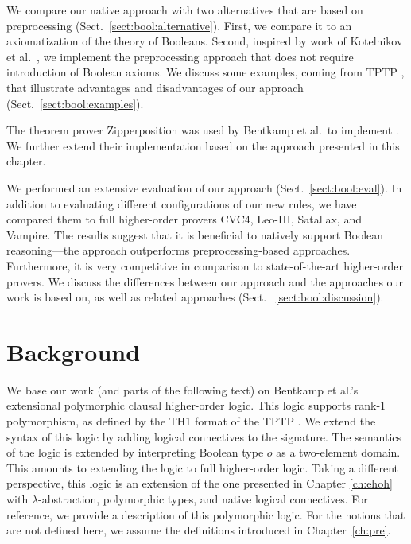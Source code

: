 We compare our native approach with two alternatives that are based on
preprocessing (Sect.~\ref{sect:bool:alternative}). First, we compare it to  an
axiomatization of the theory of Booleans. Second, inspired by work of
Kotelnikov et al.\ \cite{kotelnikov-16-fool}, we implement the preprocessing approach that does not
require introduction of Boolean axioms.
We discuss some examples, coming from TPTP \cite{gs-17-tptp}, that
illustrate advantages and disadvantages of our approach (Sect.~\ref{sect:bool:examples}).

The theorem prover Zipperposition \cite{sc-15-simon-phd,sc-supind-17} was used
by Bentkamp et al.\ to implement \lsup{}. We further extend their implementation
based on the approach presented in this chapter.

We performed an extensive evaluation of our approach (Sect.~\ref{sect:bool:eval}).
In addition to evaluating different configurations of our new rules, we have
compared them to full higher-order provers CVC4, Leo-III,  Satallax, and Vampire.
The results suggest that it is beneficial to natively support Boolean reasoning---the approach outperforms preprocessing-based approaches. Furthermore, it is
very competitive in comparison to state-of-the-art higher-order provers. We discuss the differences between our approach and the
approaches our work is based on, as well as related approaches (Sect.~
\ref{sect:bool:discussion}).


\section{Background} 
\label{sect:bool:background}

We base our work (and parts of the following text) on Bentkamp et al.'s
\cite{bbtvw-21-sup-lam} extensional polymorphic clausal higher-order logic. This
logic supports rank-1 polymorphism, as defined by the TH1 format of the TPTP
\cite{ksr-16-th1}.
We
extend the syntax of this logic by adding logical connectives to the signature.
The semantics of the logic is extended by interpreting Boolean type $o$ as a
two-element domain. This amounts to extending the logic to full higher-order
logic. Taking a different perspective, this logic is an extension of the one
presented in Chapter \ref{ch:ehoh} with $\lambda$-abstraction, polymorphic
types, and native logical connectives. For reference, we provide a
description of this polymorphic logic. For the notions that are not defined here,
we assume the definitions introduced in Chapter~\ref{ch:pre}.

